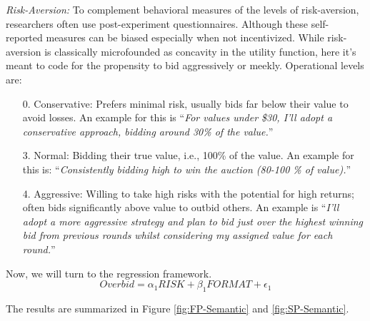 \documentclass{article} %
\begin{document}
\textit{Risk-Aversion:} To complement behavioral measures of the levels of risk-aversion, researchers often use post-experiment questionnaires.
Although these self-reported measures can be biased especially when not incentivized. While risk-aversion is classically microfounded as concavity in the utility function, here it's meant to code for the propensity to bid aggressively or meekly. Operational levels are: 
\begin{enumerate}
    \item[0.] Conservative: Prefers minimal risk, usually bids far below their value to avoid losses. 
    An example for this is ``\textit{For values under \$30, I'll adopt a conservative approach, bidding around 30\% of the value.}''
    \item[3. ] Normal: Bidding their true value, i.e., 100\% of the value. 
    An example for this is:         ``\textit{Consistently bidding high to win the auction (80-100
    \% of value).}''
    \item[4. ] Aggressive: Willing to take high risks with the potential for high returns; often bids significantly above value to outbid others. An example is ``\textit{I'll adopt a more aggressive strategy and plan to bid just over the highest winning bid from previous rounds whilst considering my assigned value for each round.}''  
\end{enumerate}

Now, we will turn to the regression framework.
\begin{equation}
    Overbid = \alpha_1 RISK + \beta_1 FORMAT + \epsilon_1
\end{equation}



The results are summarized in Figure \ref{fig:FP-Semantic} and \ref{fig:SP-Semantic}.   
\end{document}
